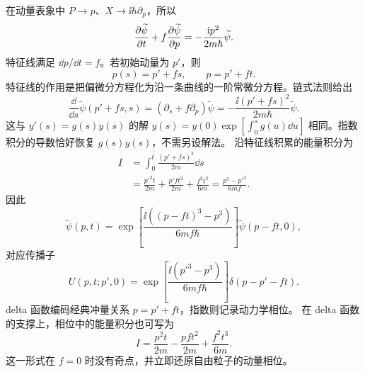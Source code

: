 \begin{checkedsolution}
在动量表象中 $P\to p$、$X\to\ii\hbar\partial_p$，所以
\begin{equation}
  \frac{\partial \widetilde\psi}{\partial t}
  +f\frac{\partial \widetilde\psi}{\partial p}
  =-\frac{\mathrm{i} p^2}{2m\hbar}\widetilde\psi.
  \label{eq:QM-C05-S04-E03-momentum-pde}
\end{equation}
特征线满足 $\dd p/\dd t=f$。若初始动量为 $p'$，则
\begin{equation}
  p(s)=p'+fs,
  \qquad
  p=p'+ft.
  \label{eq:QM-C05-S04-E03-characteristic}
\end{equation}
特征线的作用是把偏微分方程化为沿一条曲线的一阶常微分方程。链式法则给出
\begin{equation}
  \frac{\dd}{\dd s}\widetilde\psi(p'+fs,s)
  =\left(\partial_s+f\partial_p\right)\widetilde\psi
  =-\frac{\ii(p'+fs)^2}{2m\hbar}\widetilde\psi.
\end{equation}
这与 $y'(s)=g(s)y(s)$ 的解
$y(s)=y(0)\exp[\int_0^s g(u)\dd u]$ 相同。指数积分的导数恰好恢复 $g(s)y(s)$，不需另设解法。
沿特征线积累的能量积分为
\begin{align}
  I
  &=\int_0^t\frac{(p'+fs)^2}{2m}\dd s\\
  &=\frac{p'^2t}{2m}
   +\frac{p'ft^2}{2m}
   +\frac{f^2t^3}{6m}
   =\frac{p^3-p'^3}{6mf}.
  \label{eq:QM-C05-S04-E03-phase-integral}
\end{align}
因此
\begin{equation}
  \widetilde\psi(p,t)
  =\exp\left[
    \frac{\ii((p-ft)^3-p^3)}{6mf\hbar}
  \right]\widetilde\psi(p-ft,0),
\end{equation}
对应传播子
\begin{equation}
  \boxed{
  U(p,t;p',0)
  =\exp\left[
    \frac{\ii(p'^3-p^3)}{6mf\hbar}
  \right]\delta(p-p'-ft)}.
  \label{eq:QM-C05-S04-E03-momentum-propagator}
\end{equation}
delta 函数编码经典冲量关系 $p=p'+ft$，指数则记录动力学相位。
在 delta 函数的支撑上，相位中的能量积分也可写为
\begin{equation}
  I=\frac{p^2t}{2m}-\frac{pft^2}{2m}+\frac{f^2t^3}{6m}.
\end{equation}
这一形式在 $f=0$ 时没有奇点，并立即还原自由粒子的动量相位。


\end{checkedsolution}
